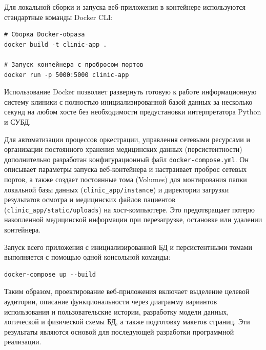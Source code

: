Для локальной сборки и запуска веб-приложения в контейнере используются стандартные команды Docker CLI:
\begin{verbatim}
# Сборка Docker-образа
docker build -t clinic-app .

# Запуск контейнера с пробросом портов
docker run -p 5000:5000 clinic-app
\end{verbatim}

Использование Docker позволяет развернуть готовую к работе информационную систему клиники с полностью инициализированной базой данных за несколько секунд на любом хосте без необходимости предустановки интерпретатора Python и СУБД.

Для автоматизации процессов оркестрации, управления сетевыми ресурсами и организации постоянного хранения медицинских данных (персистентности) дополнительно разработан конфигурационный файл \texttt{docker-compose.yml}. Он описывает параметры запуска веб-контейнера и настраивает проброс сетевых портов, а также создает постоянные тома (Volumes) для монтирования папки локальной базы данных (\texttt{clinic\_app/instance}) и директории загрузки результатов осмотра и медицинских файлов пациентов (\texttt{clinic\_app/static/uploads}) на хост-компьютере. Это предотвращает потерю накопленной медицинской информации при перезагрузке, остановке или удалении контейнера.

Запуск всего приложения с инициализированной БД и персистентными томами выполняется с помощью одной консольной команды:
\begin{verbatim}
docker-compose up --build
\end{verbatim}

Таким образом, проектирование веб-приложения включает выделение целевой аудитории, описание функциональности через диаграмму вариантов использования и пользовательские истории, разработку модели данных, логической и физической схемы БД, а также подготовку макетов страниц. Эти результаты являются основой для последующей разработки программной реализации.
